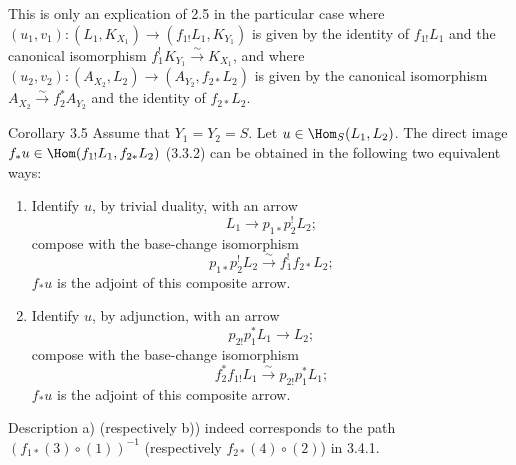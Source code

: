 This is only an explication of 2.5 in the particular case where $(u_1,v_1):(L_1,K_{X_1})\to(f_{1!}L_1,K_{Y_1})$ is given by the identity of $f_{1!}L_1$ and the canonical isomorphism $f_1^!K_{Y_1}\xrightarrow{\sim}K_{X_1}$, and where $(u_2,v_2):(A_{X_2},L_2)\to(A_{Y_2},f_{2*}L_2)$ is given by the canonical isomorphism $A_{X_2}\xrightarrow{\sim}f_2^*A_{Y_2}$ and the identity of $f_{2*}L_2$.

\begin{statement}{Corollary 3.5}
Assume that $Y_1=Y_2=S$. Let $u\in\Hom_S(L_1,L_2)$. The direct image $f_*u\in\Hom(f_{1!}L_1,f_{2*}L_2)$ (3.3.2) can be obtained in the following two equivalent ways:
\end{statement}
\begin{enumerate}[label=\alph*)]
\item Identify $u$, by trivial duality, with an arrow
\[
L_1\longrightarrow p_{1*}p_2^!L_2;
\]
compose with the base-change isomorphism
\[
p_{1*}p_2^!L_2\xrightarrow{\sim}f_1^!f_{2*}L_2;
\]
$f_*u$ is the adjoint of this composite arrow.
\item Identify $u$, by adjunction, with an arrow
\[
p_{2!}p_1^*L_1\longrightarrow L_2;
\]
compose with the base-change isomorphism
\[
f_2^*f_{1!}L_1\xrightarrow{\sim}p_{2!}p_1^*L_1;
\]
$f_*u$ is the adjoint of this composite arrow.
\end{enumerate}
Description a) (respectively b)) indeed corresponds to the path $(f_{1*}(3)\circ(1))^{-1}$ (respectively $f_{2*}(4)\circ(2)$) in 3.4.1.

